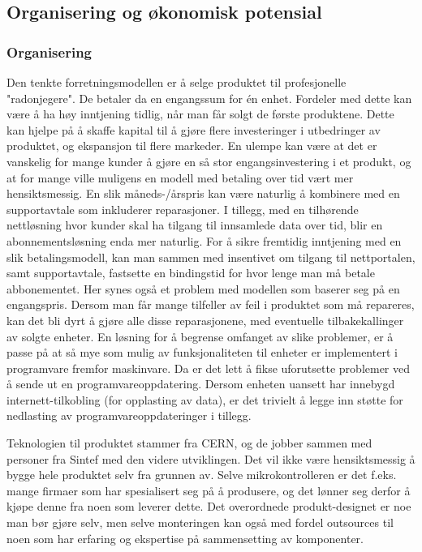 \subsection{Organisering og økonomisk potensial}

\subsubsection{Organisering}

Den tenkte forretningsmodellen er å selge produktet til profesjonelle "radonjegere".
De betaler da en engangssum for én enhet.
Fordeler med dette kan være å ha høy inntjening tidlig, når man får solgt de første produktene.
Dette kan hjelpe på å skaffe kapital til å gjøre flere investeringer i utbedringer av produktet, og ekspansjon til flere markeder.
En ulempe kan være at det er vanskelig for mange kunder å gjøre en så stor engangsinvestering i et produkt, og at for mange ville muligens en modell med betaling over tid vært mer hensiktsmessig.
En slik måneds-/årspris kan være naturlig å kombinere med en supportavtale som inkluderer reparasjoner.
I tillegg, med en tilhørende nettløsning hvor kunder skal ha tilgang til innsamlede data over tid, blir en abonnementsløsning enda mer naturlig.
For å sikre fremtidig inntjening med en slik betalingsmodell, kan man sammen med insentivet om tilgang til nettportalen, samt supportavtale, fastsette en bindingstid for hvor lenge man må betale abbonementet.
Her synes også et problem med modellen som baserer seg på en engangspris.
Dersom man får mange tilfeller av feil i produktet som må repareres, kan det bli dyrt å gjøre alle disse reparasjonene, med eventuelle tilbakekallinger av solgte enheter.
En løsning for å begrense omfanget av slike problemer, er å passe på at så mye som mulig av funksjonaliteten til enheter er implementert i programvare fremfor maskinvare.
Da er det lett å fikse uforutsette problemer ved å sende ut en programvareoppdatering.
Dersom enheten uansett har innebygd internett-tilkobling (for opplasting av data), er det trivielt å legge inn støtte for nedlasting av programvareoppdateringer i tillegg.

Teknologien til produktet stammer fra CERN, og de jobber sammen med personer fra Sintef med den videre utviklingen.
Det vil ikke være hensiktsmessig å bygge hele produktet selv fra grunnen av.
Selve mikrokontrolleren er det f.eks. mange firmaer som har spesialisert seg på å produsere, og det lønner seg derfor å kjøpe denne fra noen som leverer dette.
Det overordnede produkt-designet er noe man bør gjøre selv, men selve monteringen kan også med fordel outsources til noen som har erfaring og ekspertise på sammensetting av komponenter.

